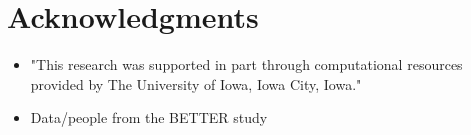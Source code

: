 \documentclass[10pt,letterpaper]{article}
\begin{document}





\section*{Acknowledgments}
\begin{itemize}
  \item "This research was supported in part through computational resources provided by The University of Iowa, Iowa City, Iowa."
  \item Data/people from the BETTER study 
\end{itemize}
\nolinenumbers
\end{document}
